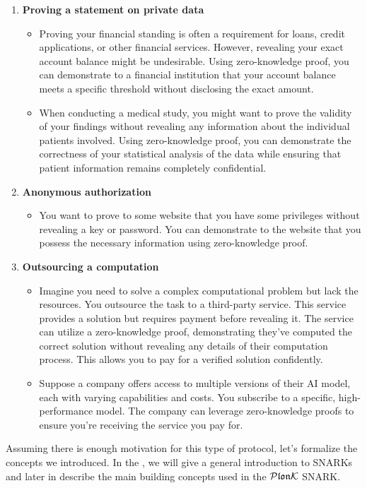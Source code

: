 \begin{enumerate}
    \item \textbf{Proving a statement on private data}
    \begin{itemize}
        \item Proving your financial standing is often a requirement for loans, credit applications, or other financial services. However, revealing your exact account balance might be undesirable. Using zero-knowledge proof, you can demonstrate to a financial institution that your account balance meets a specific threshold without disclosing the exact amount.
        \item When conducting a medical study, you might want to prove the validity of your findings without revealing any information about the individual patients involved. Using zero-knowledge proof, you can demonstrate the correctness of your statistical analysis of the data while ensuring that patient information remains completely confidential.
    \end{itemize}
    \item \textbf{Anonymous authorization}
    \begin{itemize}
        \item You want to prove to some website that you have some privileges without revealing a key or password. You can demonstrate to the website that you possess the necessary information using zero-knowledge proof.
    \end{itemize}
    \item \textbf{Outsourcing a computation} 
    \begin{itemize}
        \item Imagine you need to solve a complex computational problem but lack the resources. You outsource the task to a third-party service. This service provides a solution but requires payment before revealing it. The service can utilize a zero-knowledge proof, demonstrating they've computed the correct solution without revealing any details of their computation process. This allows you to pay for a verified solution confidently.
        \item Suppose a company offers access to multiple versions of their AI model, each with varying capabilities and costs. You subscribe to a specific, high-performance model. The company can leverage zero-knowledge proofs to ensure you're receiving the service you pay for. 
    \end{itemize}
\end{enumerate}

Assuming there is enough motivation for this type of protocol, let's formalize the concepts we introduced. In the , we will give a general introduction to SNARKs and later in  describe the main building concepts used in the $\mathcal{P}\mathfrak{lon}\mathcal{K}$ SNARK.
